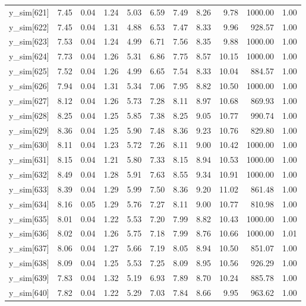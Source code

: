 \begin{table}[ht]
\begin{tabular}{rrrrrrrrrrr}
  y\_sim[621] & 7.45 & 0.04 & 1.24 & 5.03 & 6.59 & 7.49 & 8.26 & 9.78 & 1000.00 & 1.00 \\ 
  y\_sim[622] & 7.45 & 0.04 & 1.31 & 4.88 & 6.53 & 7.47 & 8.33 & 9.96 & 928.57 & 1.00 \\ 
  y\_sim[623] & 7.53 & 0.04 & 1.24 & 4.99 & 6.71 & 7.56 & 8.35 & 9.88 & 1000.00 & 1.00 \\ 
  y\_sim[624] & 7.73 & 0.04 & 1.26 & 5.31 & 6.86 & 7.75 & 8.57 & 10.15 & 1000.00 & 1.00 \\ 
  y\_sim[625] & 7.52 & 0.04 & 1.26 & 4.99 & 6.65 & 7.54 & 8.33 & 10.04 & 884.57 & 1.00 \\ 
  y\_sim[626] & 7.94 & 0.04 & 1.31 & 5.34 & 7.06 & 7.95 & 8.82 & 10.50 & 1000.00 & 1.00 \\ 
  y\_sim[627] & 8.12 & 0.04 & 1.26 & 5.73 & 7.28 & 8.11 & 8.97 & 10.68 & 869.93 & 1.00 \\ 
  y\_sim[628] & 8.25 & 0.04 & 1.25 & 5.85 & 7.38 & 8.25 & 9.05 & 10.77 & 990.74 & 1.00 \\ 
  y\_sim[629] & 8.36 & 0.04 & 1.25 & 5.90 & 7.48 & 8.36 & 9.23 & 10.76 & 829.80 & 1.00 \\ 
  y\_sim[630] & 8.11 & 0.04 & 1.23 & 5.72 & 7.26 & 8.11 & 9.00 & 10.42 & 1000.00 & 1.00 \\ 
  y\_sim[631] & 8.15 & 0.04 & 1.21 & 5.80 & 7.33 & 8.15 & 8.94 & 10.53 & 1000.00 & 1.00 \\ 
  y\_sim[632] & 8.49 & 0.04 & 1.28 & 5.91 & 7.63 & 8.55 & 9.34 & 10.91 & 1000.00 & 1.00 \\ 
  y\_sim[633] & 8.39 & 0.04 & 1.29 & 5.99 & 7.50 & 8.36 & 9.20 & 11.02 & 861.48 & 1.00 \\ 
  y\_sim[634] & 8.16 & 0.05 & 1.29 & 5.76 & 7.27 & 8.11 & 9.00 & 10.77 & 810.98 & 1.00 \\ 
  y\_sim[635] & 8.01 & 0.04 & 1.22 & 5.53 & 7.20 & 7.99 & 8.82 & 10.43 & 1000.00 & 1.00 \\ 
  y\_sim[636] & 8.02 & 0.04 & 1.26 & 5.75 & 7.18 & 7.99 & 8.76 & 10.66 & 1000.00 & 1.01 \\ 
  y\_sim[637] & 8.06 & 0.04 & 1.27 & 5.66 & 7.19 & 8.05 & 8.94 & 10.50 & 851.07 & 1.00 \\ 
  y\_sim[638] & 8.09 & 0.04 & 1.25 & 5.53 & 7.25 & 8.09 & 8.95 & 10.56 & 926.29 & 1.00 \\ 
  y\_sim[639] & 7.83 & 0.04 & 1.32 & 5.19 & 6.93 & 7.89 & 8.70 & 10.24 & 885.78 & 1.00 \\ 
  y\_sim[640] & 7.82 & 0.04 & 1.22 & 5.29 & 7.03 & 7.84 & 8.66 & 9.95 & 963.62 & 1.00 \\ 

\end{tabular}
\end{table}
